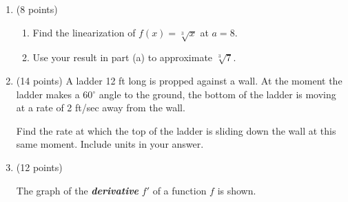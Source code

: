 \documentclass[11pt]{article}
\begin{document}
\newpage
\vspace*{-0.3in}
\begin{enumerate}
\item (8 points)

\begin{enumerate}

\item Find the linearization of $f(x) = \sqrt[3]{x}$ at $a = 8$.

\vfill

\item Use your result in part (a) to approximate $\sqrt[3]{7}$.
\vfill
\end{enumerate}
\newpage
\item (14 points) A ladder 12 ft long is propped against a wall. At the moment the ladder makes a 60$^\circ$ angle to the ground, the bottom of the ladder is moving at a rate of 2 ft/sec away from the wall.


Find the rate at which the top of the ladder is sliding down the wall at this same moment. Include units in your answer.

\vskip1in

\newpage

\item (12 points)


The graph of the \textit{\textbf{derivative}} $f'$ of a function $f$ is shown.


\end{enumerate}
\end{document}
